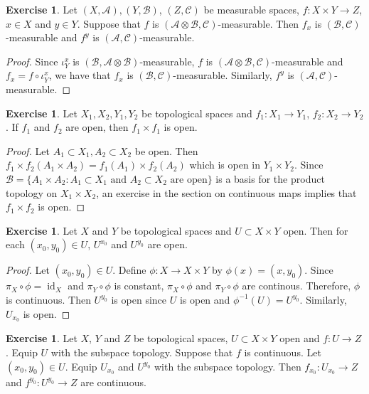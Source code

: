 \documentclass[12pt]{amsart}
\theoremstyle{definition}
\newtheorem{ex}[definition]{Exercise}
\newcommand{\MA}{\mathcal{A}}
\newcommand{\MC}{\mathcal{C}}
\newcommand{\MB}{\mathcal{B}}
\DeclareMathOperator{\id}{id}
\begin{document}
	\begin{ex}
		Let $(X,\MA), (Y, \MB)$, $(Z, \MC)$ be measurable spaces, $f: X \times Y \rightarrow Z$, $x \in X$ and $y \in Y$. Suppose that $f$ is $(\MA \otimes \MB, \MC)$-measurable. Then $f_x$ is $(\MB, \MC)$-measurable and $f^y$ is $(\MA, \MC)$-measurable. 
	\end{ex}
	
	\begin{proof}
		Since $\iota^x_Y$ is $(\MB, \MA \otimes \MB)$-measurable, $f$ is $(\MA \otimes \MB, \MC)$-measurable and $f_x = f \circ \iota^x_Y$, we have that $f_x$ is $(\MB, \MC)$-measurable. Similarly, $f^y$ is $(\MA, \MC)$-measurable.
	\end{proof}









	
	\begin{ex}
		Let $X_1, X_2,Y_1,Y_2$ be topological spaces and $f_1:X_1 \rightarrow Y_1$, $f_2:X_2 \rightarrow Y_2$. If $f_1$ and $f_2$ are open, then $f_1 \times f_1$ is open.
	\end{ex}
	
	\begin{proof}
		Let $A_1 \subset X_1, A_2 \subset X_2$ be open. Then $f_1 \times f_2(A_1 \times A_2) = f_1(A_1) \times f_2(A_2)$ which is open in $Y_1 \times Y_2$. Since $\MB = \{A_1 \times A_2:  \text{$A_1 \subset X_1$ and $A_2 \subset X_2$ are open} \}$ is a basis for the product topology on $X_1 \times X_2$, an exercise in the section on continuous maps implies that $f_1 \times f_2$ is open.
	\end{proof}
	
	\begin{ex}
		Let $X$ and $Y$ be topological spaces and $U \subset X \times Y$ open. Then for each $(x_0,  y_0) \in U$, $U^{x_0}$ and $U^{y_0}$ are open.
	\end{ex}
	
	\begin{proof}
		Let $(x_0, y_0) \in U$. Define $\phi: X \rightarrow X \times Y$ by $\phi(x) = (x, y_0)$. Since $\pi_X \circ \phi = \id_X$ and $\pi_Y \circ \phi$ is constant, $\pi_X \circ \phi$ and $\pi_Y \circ \phi$ are continous. Therefore, $\phi$ is continuous. Then $U^{y_0}$ is open since $U$ is open and $\phi^{-1}(U) = U^{y_0}$. Similarly, $U_{x_0}$ is open.
	\end{proof}
	
	\begin{ex}
		Let $X$, $Y$ and $Z$ be topological spaces, $U \subset X \times Y$ open and $f: U \rightarrow Z$. Equip $U$ with the subspace topology. Suppose that $f$ is continuous. Let $(x_0, y_0) \in U$. Equip $U_{x_0}$ and $U^{y_0}$ with the subspace topology. Then $f_{x_0}:U_{x_0} \rightarrow Z$ and $f^{y_0}: U^{y_0} \rightarrow Z$ are continuous.
	\end{ex}
	
\end{document}
